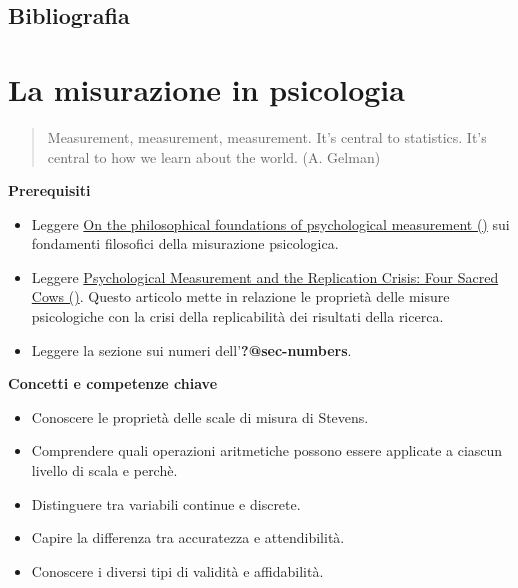\documentclass[
  letterpaper,
  DIV=11,
  numbers=noendperiod]{scrreprt}
\providecommand{\tightlist}{%
  \setlength{\itemsep}{0pt}\setlength{\parskip}{0pt}}\usepackage{longtable,booktabs,array}
\theoremstyle{definition}
\theoremstyle{remark}
\begin{document}
\section*{Bibliografia}\label{bibliografia-1}


\chapter{La misurazione in psicologia}\label{sec-measurement}

\begin{quote}
Measurement, measurement, measurement. It's central to statistics. It's
central to how we learn about the world. (A. Gelman)
\end{quote}

\textbf{Prerequisiti}

\begin{itemize}
\tightlist
\item
  Leggere
  \href{https://www.sciencedirect.com/science/article/pii/S0263224115005801?casa_token=QTLWp2GIWswAAAAA:wmewUxxK68plnyJhu51VMpVSnI4rB5wB36p4l1KlKarbFwhFTuIWUS7V5ZHdfhoqSqiy4JJoqg}{On
  the philosophical foundations of psychological measurement
  ()} sui
  fondamenti filosofici della misurazione psicologica.
\item
  Leggere
  \href{https://web.p.ebscohost.com/ehost/pdfviewer/pdfviewer?vid=0&sid=52940ed5-6696-4f73-be23-b5f868703f25\%40redis}{Psychological
  Measurement and the Replication Crisis: Four Sacred Cows
  ()}. Questo articolo mette in relazione le proprietà delle misure
  psicologiche con la crisi della replicabilità dei risultati della
  ricerca.
\item
  Leggere la sezione sui numeri dell'\textbf{?@sec-numbers}.
\end{itemize}

\textbf{Concetti e competenze chiave}

\begin{itemize}
\tightlist
\item
  Conoscere le proprietà delle scale di misura di Stevens.
\item
  Comprendere quali operazioni aritmetiche possono essere applicate a
  ciascun livello di scala e perchè.
\item
  Distinguere tra variabili continue e discrete.
\item
  Capire la differenza tra accuratezza e attendibilità.
\item
  Conoscere i diversi tipi di validità e affidabilità.
\end{itemize}
\end{document}
